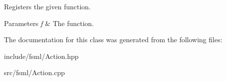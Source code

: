 Registers the given function. 


\begin{DoxyParams}{Parameters}
{\em f} & The function. \\
\hline
\end{DoxyParams}


The documentation for this class was generated from the following files\-:\begin{DoxyCompactItemize}
\item 
include/fsml/Action.\-hpp\item 
src/fsml/Action.\-cpp\end{DoxyCompactItemize}
